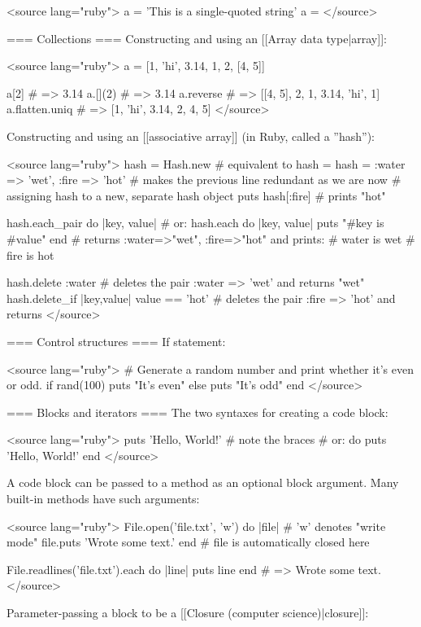 <source lang="ruby">
a = 'This is a single-quoted string'
a = %
</source>

=== Collections ===
Constructing and using an [[Array data type|array]]:

<source lang="ruby">
a = [1, 'hi', 3.14, 1, 2, [4, 5]]

a[2]             # => 3.14
a.[](2)          # => 3.14
a.reverse        # => [[4, 5], 2, 1, 3.14, 'hi', 1]
a.flatten.uniq   # => [1, 'hi', 3.14, 2, 4, 5]
</source>

Constructing and using an [[associative array]] (in Ruby, called a ''hash''):

<source lang="ruby">
hash = Hash.new # equivalent to hash = {}
hash = { :water => 'wet', :fire => 'hot' } # makes the previous line redundant as we are now
                                           # assigning hash to a new, separate hash object
puts hash[:fire] # prints "hot"

hash.each_pair do |key, value|   # or: hash.each do |key, value|
  puts "#{key} is #{value}"
end
# returns {:water=>"wet", :fire=>"hot"} and prints:
# water is wet
# fire is hot

hash.delete :water                            # deletes the pair :water => 'wet' and returns "wet"
hash.delete_if {|key,value| value == 'hot'}   # deletes the pair :fire => 'hot' and returns {}
</source>

=== Control structures ===
If statement:

<source lang="ruby">
# Generate a random number and print whether it's even or odd.
if rand(100) %
  puts "It's even"
else
  puts "It's odd"
end
</source>

=== Blocks and iterators ===
The two syntaxes for creating a code block:

<source lang="ruby">
{ puts 'Hello, World!' } # note the braces
# or:
do
  puts 'Hello, World!'
end
</source>

A code block can be passed to a method as an optional block argument.  Many built-in methods have such arguments:

<source lang="ruby">
File.open('file.txt', 'w') do |file| # 'w' denotes "write mode"
  file.puts 'Wrote some text.'
end                                  # file is automatically closed here

File.readlines('file.txt').each do |line|
  puts line
end
# => Wrote some text.
</source>

Parameter-passing a block to be a [[Closure (computer science)|closure]]:

